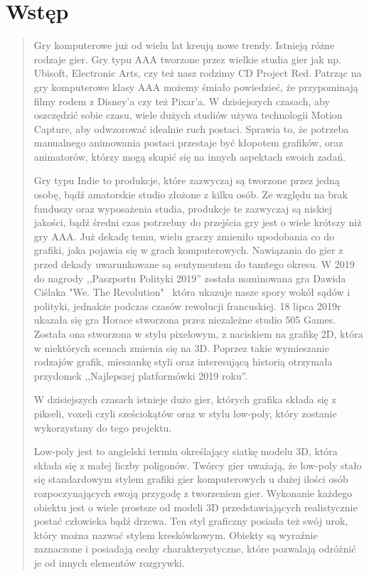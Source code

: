 \chapter*{Wstęp}
\begin{quotation}
\indent Gry komputerowe już od wielu lat kreują nowe trendy. Istnieją różne rodzaje gier.
Gry typu AAA tworzone przez wielkie studia gier jak np. Ubisoft, Electronic Arts, czy też nasz rodzimy CD Project Red. 
Patrząc na gry komputerowe klasy AAA możemy śmiało powiedzieć, że przypominają filmy rodem z Disney'a czy też Pixar'a. 
W dzisiejszych czasach, aby oszczędzić sobie czasu, wiele dużych studiów używa technologii Motion Capture, aby odwzorować idealnie ruch postaci. Sprawia to,
że potrzeba manualnego animowania postaci przestaje być kłopotem grafików, oraz animatorów, którzy mogą skupić się na innych aspektach swoich zadań.

\indent Gry typu Indie to produkcje, które zazwyczaj są tworzone przez jedną osobę, bądź amatorskie studio złożone z kilku osób. Ze względu na brak funduszy oraz wyposażenia studia, produkcje te zazwyczaj są niskiej jakości, bądź średni czas potrzebny do przejścia gry jest o wiele krótszy niż gry AAA. Już dekadę temu, wielu graczy zmieniło upodobania co do grafiki, jaka pojawia się w grach komputerowych. Nawiązania do gier z przed dekady uwarunkowane są sentymentem do tamtego okresu. W 2019 do nagrody ,,Paszportu Polityki 2019'' została nominowana gra Dawida Ciślaka "We. The Revolution" ~która ukazuje nasze spory wokół sądów i polityki, jednakże podczas czasów rewolucji francuskiej. 18 lipca 2019r ukazała się gra Horace stworzona przez niezależne studio 505 Games. Została ona stworzona w stylu pixelowym, z naciskiem na grafikę 2D, która w niektórych scenach zmienia się na 3D. Poprzez takie wymieszanie rodzajów grafik, mieszankę styli oraz interesującą historią otrzymała przydomek ,,Najlepszej platformówki 2019 roku''.

\indent W dzisiejszych czasach istnieje dużo gier, których grafika składa się z pikseli, voxeli czyli sześciokątów oraz w stylu low-poly, który zostanie wykorzystany do tego projektu.

\indent Low-poly jest to angielski termin określający siatkę modelu 3D, która składa się z małej liczby poligonów. Twórcy gier uważają, że low-poly stało się standardowym stylem grafiki gier komputerowych u dużej ilości osób rozpoczynających swoją przygodę z tworzeniem gier. Wykonanie każdego obiektu jest o wiele prostsze od modeli 3D przedstawiających realistycznie postać człowieka bądź drzewa. Ten styl graficzny posiada też swój urok, który można nazwać stylem kreskówkowym. Obiekty są wyraźnie zaznaczone i posiadają cechy charakterystyczne, które pozwalają odróżnić je od innych elementów rozgrywki.

\newpage 
\end{quotation}

